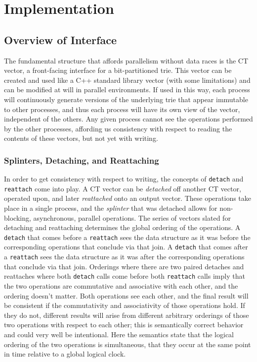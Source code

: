 \chapter{Implementation}

\section{Overview of Interface}
The fundamental structure that affords parallelism without data races is the
CT vector, a front-facing interface for a bit-partitioned trie. This vector can
be created and used like a C++ standard library vector (with some limitations)
and can be modified at will in parallel environments. If used in this way, each
process will continuously generate versions of the underlying trie that appear
immutable to other processes, and thus each process will have its own view of
the vector, independent of the others. Any given process cannot see the
operations performed by the other processes, affording us consistency with
respect to reading the contents of these vectors, but not yet with writing.

\subsection{Splinters, Detaching, and Reattaching} In order to get consistency
with respect to writing, the concepts of \texttt{detach} and \texttt{reattach}
come into play. A CT vector can be \textit{detached} off another CT vector,
operated upon, and later \textit{reattached} onto an output vector. These
operations take place in a single process, and the \textit{splinter} that was
detached allows for non-blocking, asynchronous, parallel operations. The series
of vectors slated for detaching and reattaching determines the global ordering
of the operations. A \texttt{detach} that comes before a \texttt{reattach} sees
the data structure as it was before the corresponding operations that conclude
via that join. A \texttt{detach} that comes after a \texttt{reattach} sees the
data structure as it was after the corresponding operations that conclude via
that join. Orderings where there are two paired detaches and reattaches where
both \texttt{detach} calls come before both \texttt{reattach} calls imply that
the two operations are commutative and associative with each other, and the
ordering doesn't matter. Both operations see each other, and the final result
will be consistent if the commutativity and associativity of those operations
hold. If they do not, different results will arise from different arbitrary
orderings of those two operations with respect to each other; this is
semantically correct behavior and could very well be intentional.  Here the
semantics state that the logical ordering of the two operations is simultaneous,
that they occur at the same point in time relative to a global logical clock.

